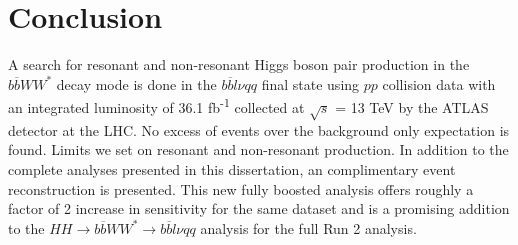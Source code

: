 \chapter{Conclusion}
A search for resonant and non-resonant Higgs boson pair production in the ${b\overline{b}WW^{*}}$ decay mode is done in the ${b\overline{b}l\nu qq}$ final state using $pp$ collision data with an integrated luminosity of 36.1 fb\textsuperscript{-1} collected at ${\sqrt{s}}$ = 13 TeV by the ATLAS detector at the LHC. No excess of events over the background only expectation is found. Limits we set on resonant and non-resonant production. \newline
\indent In addition to the complete analyses presented in this dissertation, an complimentary event reconstruction is presented. This new fully boosted analysis offers roughly a factor of 2 increase in sensitivity for the same dataset and is a promising addition to the ${HH\rightarrow b\overline{b}WW^{*}\rightarrow b\overline{b}l\nu qq}$ analysis for the full Run 2 analysis. 